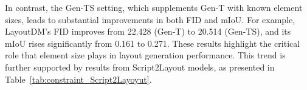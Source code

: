 \documentclass[sigconf, screen, review, anonymous]{acmart}
\begin{document}
In contrast, the Gen-TS setting, which supplements Gen-T with known element sizes, leads to substantial improvements in both FID and mIoU. For example, LayoutDM’s FID improves from 22.428 (Gen-T) to 20.514 (Gen-TS), and its mIoU rises significantly from 0.161 to 0.271. These results highlight the critical role that element size plays in layout generation performance. This trend is further supported by results from Script2Layout models, as presented in Table~\ref{tab:constraint_Script2Layoyut}.


\begin{table}[t]
\centering
\caption{
Performance of Script2Layout models under Gen-T and Gen-TS constraints, with and without script input.
}

\end{table}
\end{document}
